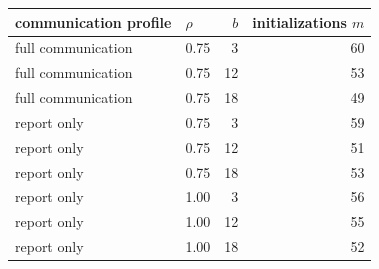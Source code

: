 \begin{tabular}{llrr}
\toprule
communication profile & $\rho$ & $b$ & initializations $m$ \\
\midrule
full communication & 0.75 & 3 & 60 \\
full communication & 0.75 & 12 & 53 \\
full communication & 0.75 & 18 & 49 \\
report only & 0.75 & 3 & 59 \\
report only & 0.75 & 12 & 51 \\
report only & 0.75 & 18 & 53 \\
report only & 1.00 & 3 & 56 \\
report only & 1.00 & 12 & 55 \\
report only & 1.00 & 18 & 52 \\
\bottomrule
\end{tabular}